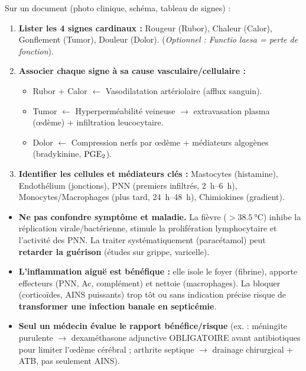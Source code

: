 \documentclass[11pt]{article}
\begin{document}
\begin{methode}
Sur un document (photo clinique, schéma, tableau de signes) :
\begin{enumerate}
    \item \textbf{Lister les 4 signes cardinaux :} Rougeur (Rubor), Chaleur (Calor), Gonflement (Tumor), Douleur (Dolor). (\emph{Optionnel : Functio laesa = perte de fonction}).
    \item \textbf{Associer chaque signe à sa cause vasculaire/cellulaire :}
    \begin{itemize}
        \item Rubor + Calor $\leftarrow$ Vasodilatation artériolaire (afflux sanguin).
        \item Tumor $\leftarrow$ Hyperperméabilité veineuse $\rightarrow$ extravasation plasma (œdème) + infiltration leucocytaire.
        \item Dolor $\leftarrow$ Compression nerfs par œdème + médiateurs algogènes (bradykinine, $\ce{PGE2}$).
    \end{itemize}
    \item \textbf{Identifier les cellules et médiateurs clés :} Mastocytes (histamine), Endothélium (jonctions), PNN (premiers infiltrés, \SIrange{2}{6}{\hour}), Monocytes/Macrophages (plus tard, \SIrange{24}{48}{\hour}), Chimiokines (gradient).
\end{enumerate}
\end{methode}

\begin{attention}
\begin{itemize}
    \item \textbf{Ne pas confondre symptôme et maladie.} La fièvre ($> \SI{38,5}{\celsius}$) inhibe la réplication virale/bactérienne, stimule la prolifération lymphocytaire et l'activité des PNN. La traiter systématiquement (paracétamol) peut \textbf{retarder la guérison} (études sur grippe, varicelle).
    \item \textbf{L'inflammation aiguë est bénéfique :} elle isole le foyer (fibrine), apporte effecteurs (PNN, Ac, complément) et nettoie (macrophages). La bloquer (corticoïdes, AINS puissants) trop tôt ou sans indication précise risque de \textbf{transformer une infection banale en septicémie}.
    \item \textbf{Seul un médecin évalue le rapport bénéfice/risque} (ex. : méningite purulente $\rightarrow$ dexaméthasone adjunctive OBLIGATOIRE avant antibiotiques pour limiter l'œdème cérébral ; arthrite septique $\rightarrow$ drainage chirurgical + ATB, pas seulement AINS).
\end{itemize}
\end{attention}
\end{document}
